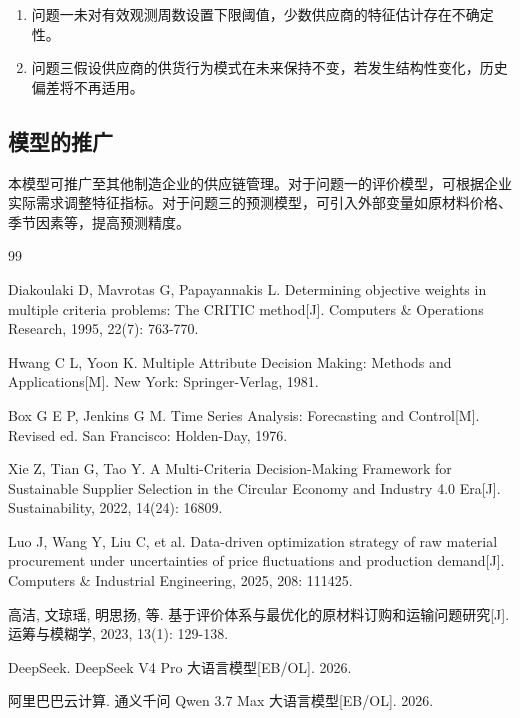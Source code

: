 \documentclass[12pt,a4paper]{ctexart}
\theoremstyle{definition}
\theoremstyle{plain}
\theoremstyle{remark}
\begin{document}
\begin{enumerate}[label=\arabic*.]
  \item 问题一未对有效观测周数设置下限阈值，少数供应商的特征估计存在不确定性。
  \item 问题三假设供应商的供货行为模式在未来保持不变，若发生结构性变化，历史偏差将不再适用。
\end{enumerate}

\subsection{模型的推广}

本模型可推广至其他制造企业的供应链管理。对于问题一的评价模型，可根据企业实际需求调整特征指标。对于问题三的预测模型，可引入外部变量如原材料价格、季节因素等，提高预测精度。


\begin{thebibliography}{99}

 Diakoulaki D, Mavrotas G, Papayannakis L. Determining objective weights in multiple criteria problems: The CRITIC method[J]. Computers \& Operations Research, 1995, 22(7): 763-770.

 Hwang C L, Yoon K. Multiple Attribute Decision Making: Methods and Applications[M]. New York: Springer-Verlag, 1981.

 Box G E P, Jenkins G M. Time Series Analysis: Forecasting and Control[M]. Revised ed. San Francisco: Holden-Day, 1976.

 Xie Z, Tian G, Tao Y. A Multi-Criteria Decision-Making Framework for Sustainable Supplier Selection in the Circular Economy and Industry 4.0 Era[J]. Sustainability, 2022, 14(24): 16809.

 Luo J, Wang Y, Liu C, et al. Data-driven optimization strategy of raw material procurement under uncertainties of price fluctuations and production demand[J]. Computers \& Industrial Engineering, 2025, 208: 111425.

 高洁, 文琼瑶, 明思扬, 等. 基于评价体系与最优化的原材料订购和运输问题研究[J]. 运筹与模糊学, 2023, 13(1): 129-138.

 DeepSeek. DeepSeek V4 Pro 大语言模型[EB/OL]. 2026.

 阿里巴巴云计算. 通义千问 Qwen 3.7 Max 大语言模型[EB/OL]. 2026.

\end{thebibliography}
\end{document}
